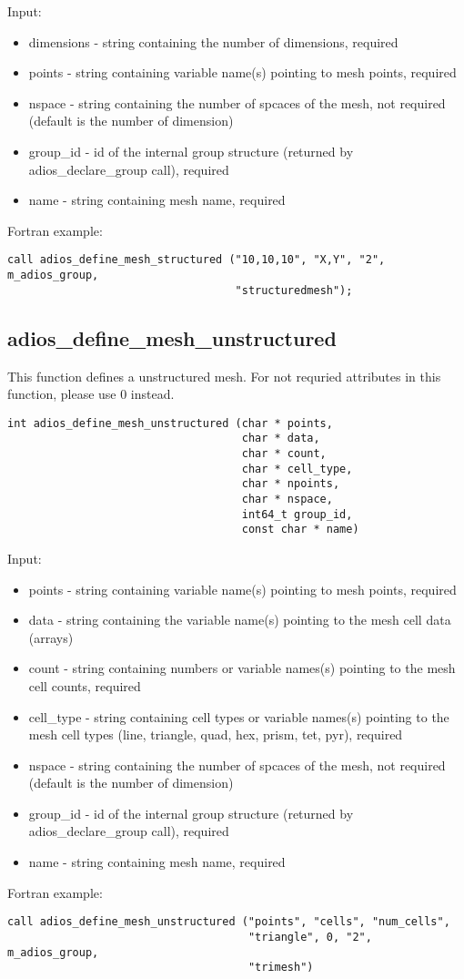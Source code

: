 Input:
\begin{itemize}
\item dimensions - string containing the number of dimensions, required
\item points - string containing variable name(s) pointing to mesh points, required 
\item nspace - string containing the number of spcaces of the mesh, not required (default is the number of dimension)
\item group\_id - id of the internal group structure (returned by adios\_declare\_group call), required
\item name - string containing mesh name, required
\end{itemize}

Fortran example:
\begin{lstlisting}[alsolanguage=Fortran,caption={},label={}]
call adios_define_mesh_structured ("10,10,10", "X,Y", "2", m_adios_group, 
                                   "structuredmesh");
\end{lstlisting}


\subsection{adios\_define\_mesh\_unstructured}
This function defines a unstructured mesh. For not requried attributes in this function, please use 0 instead.

\begin{lstlisting}[alsolanguage=Fortran,caption={},label={}]
int adios_define_mesh_unstructured (char * points,
                                    char * data,
                                    char * count,
                                    char * cell_type,
                                    char * npoints,
                                    char * nspace,
                                    int64_t group_id,
                                    const char * name)
\end{lstlisting}

Input:
\begin{itemize}
\item points - string containing variable name(s) pointing to mesh points, required
\item data - string containing the variable name(s) pointing to the mesh cell data (arrays)
\item count - string containing numbers or variable names(s) pointing to the mesh cell counts, required
\item cell\_type - string containing cell types or variable names(s) pointing to the mesh cell types 
(line, triangle, quad, hex, prism, tet, pyr), required
\item nspace - string containing the number of spcaces of the mesh, not required (default is the number of dimension)
\item group\_id - id of the internal group structure (returned by adios\_declare\_group call), required
\item name - string containing mesh name, required
\end{itemize}

Fortran example:
\begin{lstlisting}[alsolanguage=Fortran,caption={},label={}]
call adios_define_mesh_unstructured ("points", "cells", "num_cells", 
                                     "triangle", 0, "2", m_adios_group, 
                                     "trimesh")
\end{lstlisting}
